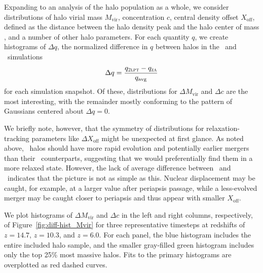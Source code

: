 Expanding to an analysis of the halo population as a whole, we consider distributions of halo virial mass $M_{\mathrm{vir}}$, concentration $c$, central density offset $X_{\mathrm{off}}$, defined as the distance between the halo density peak and the halo center of mass \citep{2013ApJ...762..109B}, and a number of other halo parameters.  For each quantity $q$, we create histograms of $\Delta q$, the normalized difference in $q$ between halos in the \lpt\ and \za\ simulations
\begin{equation} \label{eq:delta_q}
	\Delta q = \frac{q_{\textsc{2lpt}} - q_{\textsc{za}}}{q_{\mathrm{avg}}}
\end{equation}
for each simulation snapshot.  Of these, distributions for $\Delta M_{\mathrm{vir}}$ and $\Delta c$ are the most interesting, with the remainder mostly conforming to the pattern of Gaussians centered about $\Delta q = 0$.

We briefly note, however, that the symmetry of distributions for relaxation-tracking parameters like $\Delta X_{\mathrm{off}}$ might be unexpected at first glance.  As noted above, \lpt\ halos should have more rapid evolution and potentially earlier mergers than their \za\ counterparts, suggesting that we would preferentially find them in a more relaxed state.  However, the lack of average difference between \lpt\ and \za\ indicates that the picture is not as simple as this.  Nuclear displacement may be caught, for example, at a larger value after periapsis passage, while a less-evolved merger may be caught closer to periapsis and thus appear with smaller $X_{\mathrm{off}}$.

We plot histograms of $\Delta M_{\mathrm{vir}}$ and $\Delta c$ in the left and right columns, respectively, of Figure~\ref{fig:diff-hist_Mvir} for three representative timesteps at redshifts of $z = 14.7$, $z = 10.3$, and $z = 6.0$.  For each panel, the blue histogram includes the entire included halo sample, and the smaller gray-filled green histogram includes only the top 25\% most massive halos.  Fits to the primary histograms are overplotted as red dashed curves.

